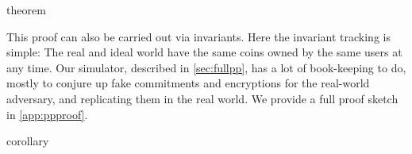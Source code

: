 \fussy

{theorem}

This proof can also be carried out via invariants. Here the invariant tracking
is simple: The real and ideal world have the same coins owned by the same users
at any time. Our simulator, described in \iffull\autoref{sec:fullpp}\else\cite[Appendix~C.4]{fullversion}\fi, has a lot of
book-keeping to do, mostly to conjure up fake commitments and encryptions for
the real-world adversary, and replicating them in the real world. We provide a
full proof sketch in \iffull\autoref{app:ppproof}\else\cite[Appendix~E]{fullversion}\fi.

{corollary}

